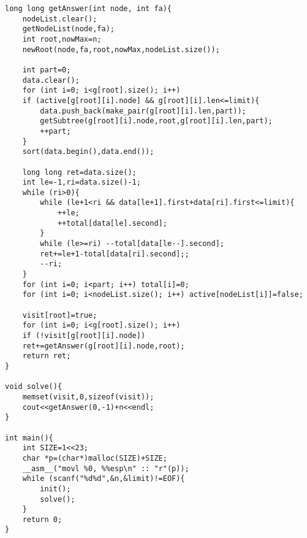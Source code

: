 \begin{verbatim}
long long getAnswer(int node, int fa){
    nodeList.clear();
    getNodeList(node,fa);
    int root,nowMax=n;
    newRoot(node,fa,root,nowMax,nodeList.size());

    int part=0;
    data.clear();
    for (int i=0; i<g[root].size(); i++)
    if (active[g[root][i].node] && g[root][i].len<=limit){
        data.push_back(make_pair(g[root][i].len,part));
        getSubtree(g[root][i].node,root,g[root][i].len,part);
        ++part;
    }
    sort(data.begin(),data.end());

    long long ret=data.size();
    int le=-1,ri=data.size()-1;
    while (ri>0){
        while (le+1<ri && data[le+1].first+data[ri].first<=limit){
            ++le;
            ++total[data[le].second];
        }
        while (le>=ri) --total[data[le--].second];
        ret+=le+1-total[data[ri].second];;
        --ri;
    }
    for (int i=0; i<part; i++) total[i]=0;
    for (int i=0; i<nodeList.size(); i++) active[nodeList[i]]=false;

    visit[root]=true;
    for (int i=0; i<g[root].size(); i++)
    if (!visit[g[root][i].node])
    ret+=getAnswer(g[root][i].node,root);
    return ret;
}

void solve(){
    memset(visit,0,sizeof(visit));
    cout<<getAnswer(0,-1)+n<<endl;
}

int main(){
    int SIZE=1<<23;
    char *p=(char*)malloc(SIZE)+SIZE;
    __asm__("movl %0, %%esp\n" :: "r"(p));
    while (scanf("%d%d",&n,&limit)!=EOF){
        init();
        solve();
    }
    return 0;
}
\end{verbatim}
